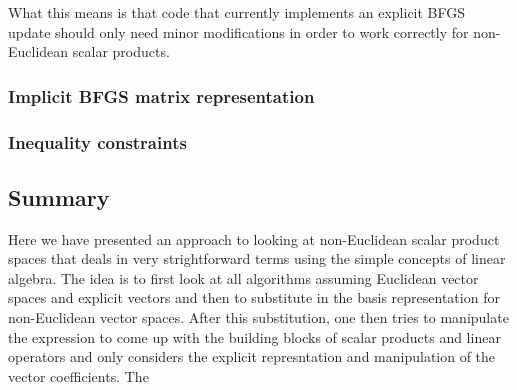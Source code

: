  What this means is that code that currently
implements an explicit BFGS update should only need minor modifications in
order to work correctly for non-Euclidean scalar products.

\subsubsection*{Implicit BFGS matrix representation}




\subsubsection{Inequality constraints}

\subsection{Summary}

Here we have presented an approach to looking at non-Euclidean scalar product
spaces that deals in very strightforward terms using the simple concepts of
linear algebra.  The idea is to first look at all algorithms assuming
Euclidean vector spaces and explicit vectors and then to substitute in the
basis representation for non-Euclidean vector spaces.  After this
substitution, one then tries to manipulate the expression to come up with the
building blocks of scalar products and linear operators and only considers the
explicit represntation and manipulation of the vector coefficients.  The
